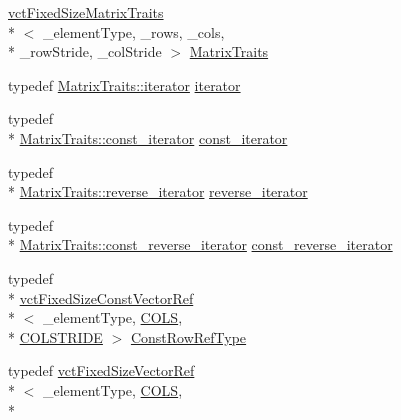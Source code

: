 \begin{DoxyCompactItemize}
\hyperlink{classvct_fixed_size_matrix_traits}{vct\-Fixed\-Size\-Matrix\-Traits}\\*
$<$ \-\_\-element\-Type, \-\_\-rows, \-\_\-cols, \\*
\-\_\-row\-Stride, \-\_\-col\-Stride $>$ \hyperlink{classvct_fixed_size_const_matrix_base_a013c7db3c4e38c1573c29ee8ff40016f}{Matrix\-Traits}
\item 
typedef \hyperlink{classvct_fixed_size_matrix_traits_a677065481ada218e2559cdec92e97fd8}{Matrix\-Traits\-::iterator} \hyperlink{classvct_fixed_size_const_matrix_base_a4a1ca42894c9dac29243adf6ac266205}{iterator}
\item 
typedef \\*
\hyperlink{classvct_fixed_size_matrix_traits_a8f7178fb03f45772c705fba16e08065d}{Matrix\-Traits\-::const\-\_\-iterator} \hyperlink{classvct_fixed_size_const_matrix_base_a896eacc5ccf7915b3e109bf9dbded884}{const\-\_\-iterator}
\item 
typedef \\*
\hyperlink{classvct_fixed_size_matrix_traits_aa132098455575ae9bc4962c994273baa}{Matrix\-Traits\-::reverse\-\_\-iterator} \hyperlink{classvct_fixed_size_const_matrix_base_a7611e666969b09bd846c46a1a85401b0}{reverse\-\_\-iterator}
\item 
typedef \\*
\hyperlink{classvct_fixed_size_matrix_traits_a362cff0931f811552609307e80af3eab}{Matrix\-Traits\-::const\-\_\-reverse\-\_\-iterator} \hyperlink{classvct_fixed_size_const_matrix_base_a86918b3da51e15dce72b62abdc6378fa}{const\-\_\-reverse\-\_\-iterator}
\item 
typedef \\*
\hyperlink{classvct_fixed_size_const_vector_ref}{vct\-Fixed\-Size\-Const\-Vector\-Ref}\\*
$<$ \-\_\-element\-Type, \hyperlink{classvct_fixed_size_const_matrix_base_a05da4a844e1880e31d3052abb9a8063ba99583531bd0415ad92eed81fc931d592}{C\-O\-L\-S}, \\*
\hyperlink{classvct_fixed_size_const_matrix_base_a0aa9b864b8810dd6a50640c965564bd0aee4513ad3dee685fdda1bc2c264be993}{C\-O\-L\-S\-T\-R\-I\-D\-E} $>$ \hyperlink{classvct_fixed_size_const_matrix_base_a74355396eec7437755398c2810e0df41}{Const\-Row\-Ref\-Type}
\item 
typedef \hyperlink{classvct_fixed_size_vector_ref}{vct\-Fixed\-Size\-Vector\-Ref}\\*
$<$ \-\_\-element\-Type, \hyperlink{classvct_fixed_size_const_matrix_base_a05da4a844e1880e31d3052abb9a8063ba99583531bd0415ad92eed81fc931d592}{C\-O\-L\-S}, \\*

\end{DoxyCompactItemize}
